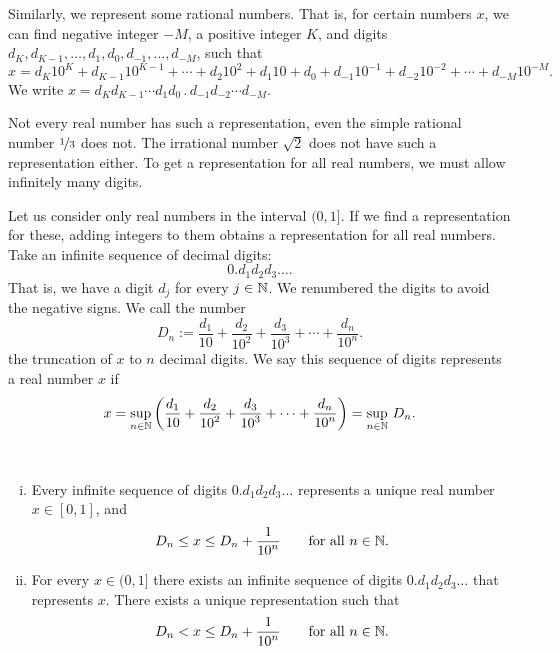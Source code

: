 Similarly, we
represent some rational numbers.  That is, for certain
numbers $x$, we can find
negative integer $-M$, a positive integer $K$, and digits
$d_K,d_{K-1},\ldots,d_1,d_0,d_{-1},\ldots,d_{-M}$, such that
\begin{equation*}
x = d_K {10}^K + d_{K-1} {10}^{K-1} + \cdots + d_2 {10}^2 + d_1 10 + d_0 
+ d_{-1} {10}^{-1} + d_{-2} {10}^{-2} + \cdots + d_{-M} {10}^{-M} .
\end{equation*}
We write $x = d_K d_{K-1} \cdots d_1 d_0 \, . \, d_{-1} d_{-2} \cdots d_{-M}$.

Not every real number has such a representation, even the simple
rational number $\nicefrac{1}{3}$ does not.  The irrational number $\sqrt{2}$ 
does not have such a representation either.  To get a representation for
all real numbers, we must allow infinitely many digits.

Let us consider only real numbers in the interval $(0,1]$.  If
we find a representation for these, adding 
integers to them obtains a representation for all real numbers.
Take an infinite sequence of decimal digits:
\begin{equation*}
0.d_1d_2d_3\ldots.
\end{equation*}
That is, we have a digit $d_j$ for every $j \in {\mathbb{N}}$.
We renumbered the digits to avoid the negative signs.
We call the number
\begin{equation*}
D_n := 
\frac{d_1}{10} + 
\frac{d_2}{{10}^2} + 
\frac{d_3}{{10}^3} + 
\cdots +
\frac{d_n}{{10}^n} .
\end{equation*}
the truncation of $x$ to $n$ decimal digits.
We say this
sequence of digits represents a real number $x$ if
\begin{equation*}
x =
\sup_{n \in {\mathbb{N}}} \left(
\frac{d_1}{10} + 
\frac{d_2}{{10}^2} + 
\frac{d_3}{{10}^3} + 
\cdots +
\frac{d_n}{{10}^n}
\right) =
\sup_{n \in {\mathbb{N}}} \, D_n .
\end{equation*}

\begin{prop} \label{prop:decimalprop}
{~}
\begin{enumerate}[(i)]
\item
Every infinite sequence of digits
$0.d_1d_2d_3\ldots$ represents a unique real number $x \in [0,1]$, and
\begin{equation*}
D_n \leq x \leq D_n+\frac{1}{{10}^n} \qquad \text{for all } n \in {\mathbb{N}}.
\end{equation*}
\item
For every $x \in (0,1]$ there exists an infinite sequence of digits
$0.d_1d_2d_3\ldots$ that represents $x$.
There exists a unique representation such that
\begin{equation*}
D_n < x \leq D_n+\frac{1}{{10}^n} \qquad \text{for all } n \in {\mathbb{N}}.
\end{equation*}
\end{enumerate}
\end{prop}

